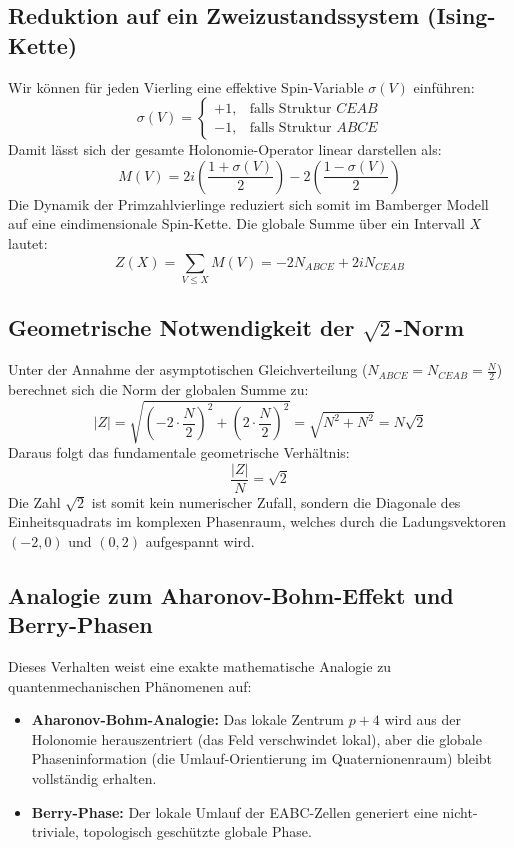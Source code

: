 \documentclass[11pt,a4paper]{article}
\theoremstyle{plain}
\theoremstyle{definition}
\numberwithin{equation}{section}
\begin{document}
\subsection{Reduktion auf ein Zweizustandssystem (Ising-Kette)}
Wir können für jeden Vierling eine effektive Spin-Variable $\sigma(V)$ einführen:
\begin{equation}
\sigma(V) = \begin{cases} +1, & \text{falls Struktur } CEAB \\ -1, & \text{falls Struktur } ABCE \end{cases}
\end{equation}
Damit lässt sich der gesamte Holonomie-Operator linear darstellen als:
\begin{equation}
M(V) = 2i \left(\frac{1+\sigma(V)}{2}\right) - 2 \left(\frac{1-\sigma(V)}{2}\right)
\end{equation}
Die Dynamik der Primzahlvierlinge reduziert sich somit im Bamberger Modell auf eine eindimensionale Spin-Kette. Die globale Summe über ein Intervall $X$ lautet:
\begin{equation}
Z(X) = \sum_{V \le X} M(V) = -2 N_{ABCE} + 2i N_{CEAB}
\end{equation}

\subsection{Geometrische Notwendigkeit der $\sqrt{2}$-Norm}
Unter der Annahme der asymptotischen Gleichverteilung ($N_{ABCE} = N_{CEAB} = \frac{N}{2}$) berechnet sich die Norm der globalen Summe zu:
\begin{equation}
|Z| = \sqrt{\left(-2 \cdot \frac{N}{2}\right)^2 + \left(2 \cdot \frac{N}{2}\right)^2} = \sqrt{N^2 + N^2} = N\sqrt{2}
\end{equation}
Daraus folgt das fundamentale geometrische Verhältnis:
\begin{equation}
\frac{|Z|}{N} = \sqrt{2}
\end{equation}
Die Zahl $\sqrt{2}$ ist somit kein numerischer Zufall, sondern die Diagonale des Einheitsquadrats im komplexen Phasenraum, welches durch die Ladungsvektoren $(-2,0)$ und $(0,2)$ aufgespannt wird.

\subsection{Analogie zum Aharonov-Bohm-Effekt und Berry-Phasen}
Dieses Verhalten weist eine exakte mathematische Analogie zu quantenmechanischen Phänomenen auf:
\begin{itemize}
    \item \textbf{Aharonov-Bohm-Analogie:} Das lokale Zentrum $p+4$ wird aus der Holonomie herauszentriert (das Feld verschwindet lokal), aber die globale Phaseninformation (die Umlauf-Orientierung im Quaternionenraum) bleibt vollständig erhalten.
    \item \textbf{Berry-Phase:} Der lokale Umlauf der EABC-Zellen generiert eine nicht-triviale, topologisch geschützte globale Phase.
\end{itemize}
\end{document}
